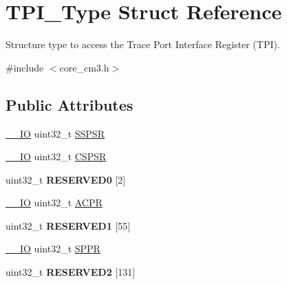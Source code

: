 \hypertarget{structTPI__Type}{}\section{T\+P\+I\+\_\+\+Type Struct Reference}
\label{structTPI__Type}


Structure type to access the Trace Port Interface Register (T\+PI).  




{\ttfamily \#include $<$core\+\_\+cm3.\+h$>$}

\subsection*{Public Attributes}
\begin{DoxyCompactItemize}
\item 
\hyperlink{core__sc300_8h_aec43007d9998a0a0e01faede4133d6be}{\+\_\+\+\_\+\+IO} uint32\+\_\+t \hyperlink{structTPI__Type_a158e9d784f6ee6398f4bdcb2e4ca0912}{S\+S\+P\+SR}
\item 
\hyperlink{core__sc300_8h_aec43007d9998a0a0e01faede4133d6be}{\+\_\+\+\_\+\+IO} uint32\+\_\+t \hyperlink{structTPI__Type_aa723ef3d38237aa2465779b3cc73a94a}{C\+S\+P\+SR}
\item 
uint32\+\_\+t {\bfseries R\+E\+S\+E\+R\+V\+E\+D0} \mbox{[}2\mbox{]}\hypertarget{structTPI__Type_ad331234edd4a834f478e67bd979dc909}{}\label{structTPI__Type_ad331234edd4a834f478e67bd979dc909}

\item 
\hyperlink{core__sc300_8h_aec43007d9998a0a0e01faede4133d6be}{\+\_\+\+\_\+\+IO} uint32\+\_\+t \hyperlink{structTPI__Type_ad75832a669eb121f6fce3c28d36b7fab}{A\+C\+PR}
\item 
uint32\+\_\+t {\bfseries R\+E\+S\+E\+R\+V\+E\+D1} \mbox{[}55\mbox{]}\hypertarget{structTPI__Type_a1626c5caf1c386f81ca01eb0daea2e51}{}\label{structTPI__Type_a1626c5caf1c386f81ca01eb0daea2e51}

\item 
\hyperlink{core__sc300_8h_aec43007d9998a0a0e01faede4133d6be}{\+\_\+\+\_\+\+IO} uint32\+\_\+t \hyperlink{structTPI__Type_a3eb655f2e45d7af358775025c1a50c8e}{S\+P\+PR}
\item 
uint32\+\_\+t {\bfseries R\+E\+S\+E\+R\+V\+E\+D2} \mbox{[}131\mbox{]}\hypertarget{structTPI__Type_acc0bbc252ec6ffa1db1a40cd8dd41b95}{}\label{structTPI__Type_acc0bbc252ec6ffa1db1a40cd8dd41b95}


\end{DoxyCompactItemize}
